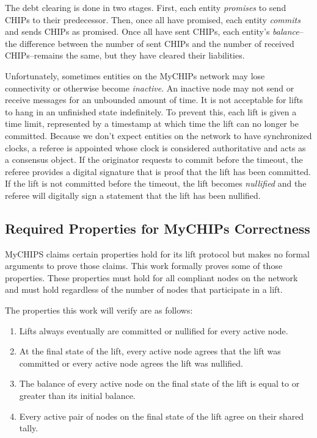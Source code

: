 \documentclass[runningheads]{llncs}
\begin{document}
The debt clearing is done in two stages. First, each entity \emph{promises} to send CHIPs to their predecessor. Then, once all have promised, each entity \emph{commits} and sends CHIPs as promised. Once all have sent CHIPs, each entity's \emph{balance}--the difference between the number of sent CHIPs and the number of received CHIPs--remains the same, but they have cleared their liabilities. 

Unfortunately, sometimes entities on the MyCHIPs network may lose connectivity or otherwise become \emph{inactive}. An inactive node may not send or receive messages for an unbounded amount of time. It is not acceptable for lifts to hang in an unfinished state indefinitely. To prevent this, each lift is given a time limit, represented by a timestamp at which time the lift can no longer be committed. Because we don't expect entities on the network to have synchronized clocks, a referee is appointed whose clock is considered authoritative and acts as a consensus object. If the originator requests to commit before the timeout, the referee provides a digital signature that is proof that the lift has been committed. If the lift is not committed before the timeout, the lift becomes \emph{nullified} and the referee will digitally sign a statement that the lift has been nullified.

\subsection{Required Properties for MyCHIPs Correctness}\label{sec:requiredProperties}

MyCHIPS claims certain properties hold for its lift protocol but makes no formal arguments to prove those claims. This work formally proves some of those properties. These properties must hold for all compliant nodes on the network and must hold regardless of the number of nodes that participate in a lift. 

The properties this work will verify are as follows:

\begin{enumerate}
\item Lifts always eventually are committed or nullified for every active node. 
\item At the final state of the lift, every active node agrees that the lift was committed or every active node agrees the lift was nullified. 
\item The balance of every active node on the final state of the lift is equal to or greater than its initial balance.
\item Every active pair of nodes on the final state of the lift agree on their shared tally.
\end{enumerate}
\end{document}
